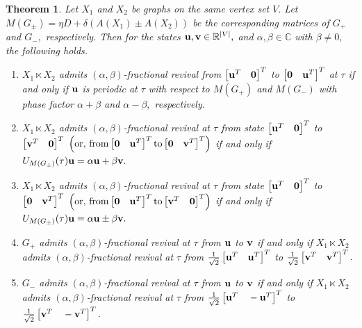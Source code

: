 \documentclass[12pt,a4paper]{article}
\newtheorem{thm}{Theorem}
\def \u {{\bf u}}
\def \v {{\bf v}}
\newcommand{\ob}[1]{\left(#1\right)}
\newcommand{\tb}[1]{\left[#1\right]}
\begin{document}
\begin{thm}\label{5t21}
    Let $X_1$ and $X_2$ be graphs on the same vertex set $V.$ Let $M(G_{\pm})=\eta D+\delta (A(X_1)\pm A(X_2))$ be the corresponding matrices of $G_+$ and $G_-,$ respectively. Then for the states $\u, \v\in \mathbb{R}^{|V|},$ and $\alpha,\beta\in\mathbb{C}$ with $\beta\neq 0,$ the following holds.
   \begin{enumerate}

\item $X_1\ltimes X_2$ admits $(\alpha,\beta)$-fractional revival from $\tb{\u^T \quad \mathbf{0}}^T$
 to $\tb{\mathbf{0} \quad 
\u^T}^T$ at $\tau$ if and only if $\u$ is periodic at $\tau$ with respect to $M(G_+)$ and $M(G_-)$ with phase factor $\alpha+\beta$ and $\alpha-\beta,$ respectively. 

\item $X_1\ltimes X_2$ admits $(\alpha,\beta)$-fractional revival at $\tau$ from state $\tb{\u^T \quad \mathbf{0}}
^T$ to  $\tb{\v^T \quad \mathbf{0}}
^T$ $\ob{\text{or, from} \tb{  \mathbf{0} \quad \u^T}
^T \text{to}   \tb{ 
\mathbf{0} \quad \v^T}^T}$ if and only if  $U_{M(G_\pm)}(\tau)\u=\alpha\u+\beta\v.$ 

\item $X_1\ltimes X_2$ admits $(\alpha,\beta)$-fractional revival at $\tau$ from state $\tb{\u^T \quad \mathbf{0}}
^T$ to $\tb{\mathbf{0} \quad 
\v^T}^T$ $\ob{\text{or, from} \tb{  \mathbf{0} \quad \u^T}
^T \text{to}   \tb{ 
\v^T \quad \mathbf{0}}^T}$ if and only if  $U_{M(G_\pm)}(\tau)\u=\alpha\u\pm \beta\v.$

\item $G_+$ admits $(\alpha,\beta)$-fractional revival at $\tau$ from $\u$ to $\v$ if and only if $X_1\ltimes X_2$ admits $(\alpha,\beta)$-fractional revival at $\tau$ from $\frac{1}{\sqrt{2}}\tb{\u^T \quad \u^T}
^T$ to   $\frac{1}{\sqrt{2}}\tb{\v^T \quad \v^T}
^T.$ 

\item $G_-$ admits $(\alpha,\beta)$-fractional revival at $\tau$ from $\u$ to $\v$ if and only if $X_1\ltimes X_2$ admits $(\alpha,\beta)$-fractional revival at $\tau$ from $\frac{1}{\sqrt{2}}\tb{\u^T \quad -\u^T}
^T$ to   $\frac{1}{\sqrt{2}}\tb{\v^T \quad -\v^T}
^T.$
\end{enumerate} 

\end{thm}
\end{document}
